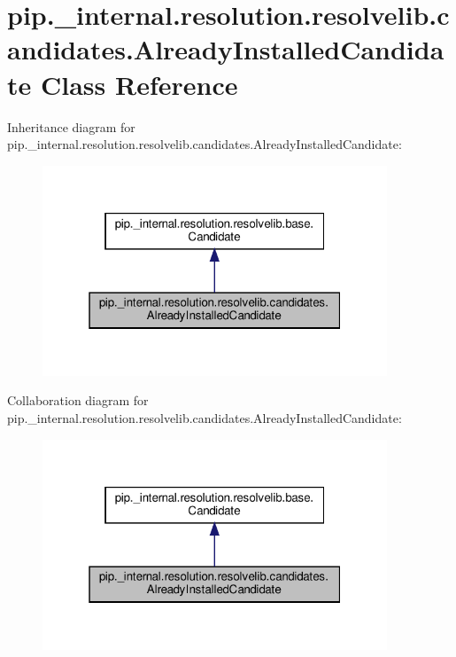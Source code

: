 \hypertarget{classpip_1_1__internal_1_1resolution_1_1resolvelib_1_1candidates_1_1AlreadyInstalledCandidate}{}\section{pip.\+\_\+internal.\+resolution.\+resolvelib.\+candidates.\+Already\+Installed\+Candidate Class Reference}
\label{classpip_1_1__internal_1_1resolution_1_1resolvelib_1_1candidates_1_1AlreadyInstalledCandidate}


Inheritance diagram for pip.\+\_\+internal.\+resolution.\+resolvelib.\+candidates.\+Already\+Installed\+Candidate\+:
\nopagebreak
\begin{figure}[H]
\begin{center}
\leavevmode
\includegraphics[width=292pt]{classpip_1_1__internal_1_1resolution_1_1resolvelib_1_1candidates_1_1AlreadyInstalledCandidate__inherit__graph}
\end{center}
\end{figure}


Collaboration diagram for pip.\+\_\+internal.\+resolution.\+resolvelib.\+candidates.\+Already\+Installed\+Candidate\+:
\nopagebreak
\begin{figure}[H]
\begin{center}
\leavevmode
\includegraphics[width=292pt]{classpip_1_1__internal_1_1resolution_1_1resolvelib_1_1candidates_1_1AlreadyInstalledCandidate__coll__graph}
\end{center}
\end{figure}
